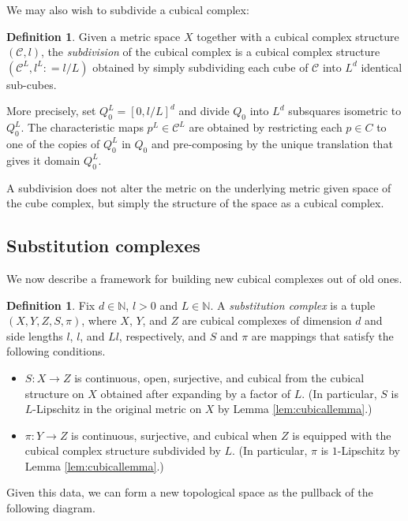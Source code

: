 \documentclass{amsart}
\theoremstyle{plain}
\theoremstyle{definition}
\newtheorem{definition}[theorem]{Definition}
\numberwithin{equation}{section}
\numberwithin{theorem}{section}
\newcommand{\N}{\mathbb{N}}
\newcommand{\cC}{\mathcal{C}}
\begin{document}
We may also wish to subdivide a cubical complex:

\begin{definition}     Given a metric space $X$ together with a cubical complex structure $(\cC,l)$, the \emph{subdivision} of the cubical complex is a cubical complex structure $(\cC^L, l^L\colon=l/L)$ obtained by simply subdividing each cube of $\cC$ into $L^d$ identical sub-cubes.
    
    More precisely, set $Q_0^L = [0,l/L]^d$ and divide $Q_0$ into $L^d$ subsquares isometric to $Q_0^L$.  The characteristic maps $p^L\in \cC^L$ are obtained by restricting each $p\in C$ to one of the copies of $Q_0^L$ in $Q_0$ and pre-composing by the unique translation that gives it domain $Q_0^L$. 
\end{definition}


A subdivision does not alter the metric on the underlying metric given space of the cube complex, but simply the structure of the space as a cubical complex.

\subsection{Substitution complexes}

We now describe a framework for building new cubical complexes out of old ones.

\begin{definition}\label{def:substitutioncomplex} Fix $d\in\mathbb{N}$, $l>0$ and $L\in \N$. A \emph{substitution complex} is a tuple $(X,Y, Z,S, \pi)$, where $X$, $Y$, and $Z$ are cubical complexes of dimension $d$ and side lengths $l$, $l$, and $Ll$, respectively, and $S$ and $\pi$ are mappings that satisfy the following conditions.
\begin{itemize}
\item $S\colon X \to Z$ is continuous, open, surjective, and cubical from the cubical structure on $X$ obtained after expanding by a factor of $L$. (In particular, $S$ is  $L$-Lipschitz in the original metric on $X$ by Lemma \ref{lem:cubicallemma}.) 
\item  $\pi:Y\to Z$  is continuous, surjective, and cubical when $Z$ is equipped with the cubical complex structure subdivided by $L$. (In particular, $\pi$ is $1$-Lipschitz by Lemma \ref{lem:cubicallemma}.)
\end{itemize}
\end{definition}

Given this data, we can form a new topological space as the pullback of the following diagram.
\end{document}
